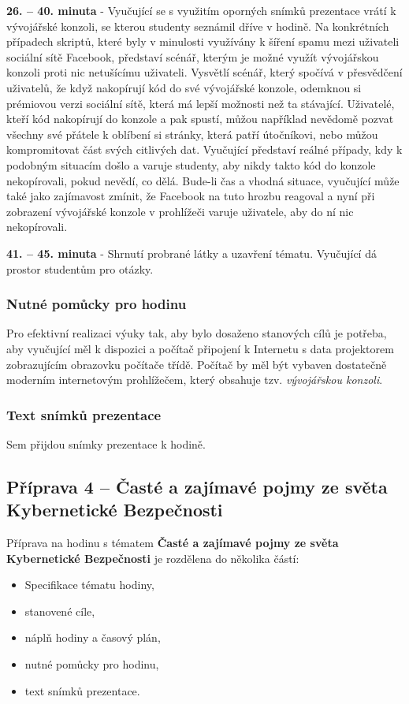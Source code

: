 \documentclass[a4paper, 12pt]{article}
\begin{document}
\textbf{26. -- 40. minuta} - Vyučující se s využitím oporných snímků prezentace vrátí k vývojářské konzoli, se kterou studenty seznámil dříve v hodině. Na konkrétních případech skriptů, které byly v minulosti využívány k šíření spamu mezi uživateli sociální sítě Facebook, představí scénář, kterým je možné využít vývojářskou konzoli proti nic netušícímu uživateli. Vysvětlí scénář, který spočívá v přesvědčení uživatelů, že když nakopírují kód do své vývojářské konzole, odemknou si prémiovou verzi sociální sítě, která má lepší možnosti než ta stávající. Uživatelé, kteří kód nakopírují do konzole a pak spustí, můžou například nevědomě pozvat všechny své přátele k oblíbení si stránky, která patří útočníkovi, nebo můžou kompromitovat část svých citlivých dat. Vyučující představí reálné případy, kdy k podobným situacím došlo a varuje studenty, aby nikdy takto kód do konzole nekopírovali, pokud nevědí, co dělá. Bude-li čas a vhodná situace, vyučující může také jako zajímavost zmínit, že Facebook na tuto hrozbu reagoval a nyní při zobrazení vývojářské konzole v prohlížeči varuje uživatele, aby do ní nic nekopírovali.

\textbf{41. -- 45. minuta} - Shrnutí probrané látky a uzavření tématu. Vyučující dá prostor studentům pro otázky.

\subsubsection{Nutné pomůcky pro hodinu}
Pro efektivní realizaci výuky tak, aby bylo dosaženo stanových cílů je potřeba, aby vyučující měl k dispozici a počítač připojení k Internetu s data projektorem zobrazujícím obrazovku počítače třídě. Počítač by měl být vybaven dostatečně moderním internetovým prohlížečem, který obsahuje tzv. \textit{vývojářskou konzoli}.

\subsubsection{Text snímků prezentace}
Sem přijdou snímky prezentace k hodině.


\subsection{Příprava 4 -- Časté a zajímavé pojmy ze světa Kybernetické Bezpečnosti}
Příprava na hodinu s tématem \textbf{Časté a zajímavé pojmy ze světa Kybernetické Bezpečnosti} je rozdělena do několika částí:
\begin{itemize}
        \setlength{\itemsep}{-3pt}
        \item Specifikace tématu hodiny,
        \item stanovené cíle,
        \item náplň hodiny a časový plán,
        \item nutné pomůcky pro hodinu,
        \item text snímků prezentace.
\end{itemize}
\end{document}
